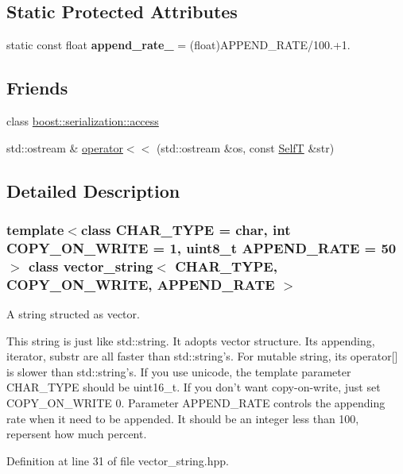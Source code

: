 \subsection*{Static Protected Attributes}
\begin{CompactItemize}
\item 
\hypertarget{classvector__string_824eeb2eece5dec26d255deddab7f604}{
static const float \textbf{append\_\-rate\_\-} = (float)APPEND\_\-RATE/100.+1.}
\label{classvector__string_824eeb2eece5dec26d255deddab7f604}

\end{CompactItemize}
\subsection*{Friends}
\begin{CompactItemize}
\item 
class \hyperlink{classvector__string_c98d07dd8f7b70e16ccb9a01abf56b9c}{boost::serialization::access}
\item 
std::ostream \& \hyperlink{classvector__string_9f77d965eac7a717e9124196d686e094}{operator$<$$<$} (std::ostream \&os, const \hyperlink{classvector__string}{SelfT} \&str)
\end{CompactItemize}


\subsection{Detailed Description}
\subsubsection*{template$<$class CHAR\_\-TYPE = char, int COPY\_\-ON\_\-WRITE = 1, uint8\_\-t APPEND\_\-RATE = 50$>$ class vector\_\-string$<$ CHAR\_\-TYPE, COPY\_\-ON\_\-WRITE, APPEND\_\-RATE $>$}

A string structed as vector. 

This string is just like std::string. It adopts vector structure. Its appending, iterator, substr are all faster than std::string's. For mutable string, its operator\mbox{[}\mbox{]} is slower than std::string's. If you use unicode, the template parameter CHAR\_\-TYPE should be uint16\_\-t. If you don't want copy-on-write, just set COPY\_\-ON\_\-WRITE 0. Parameter APPEND\_\-RATE controls the appending rate when it need to be appended. It should be an integer less than 100, repersent how much percent. 

Definition at line 31 of file vector\_\-string.hpp.

